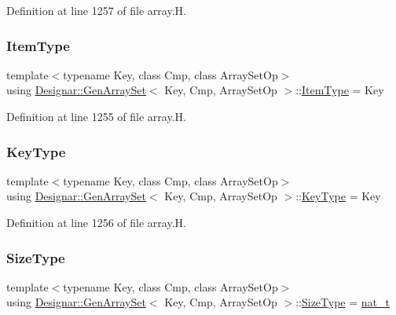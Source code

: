 Definition at line 1257 of file array.\+H.

\mbox{\label{class_designar_1_1_gen_array_set_a4db3cb71a2b2f88fee2a5f66688e5230}} 
\subsubsection{\texorpdfstring{Item\+Type}{ItemType}}
{\footnotesize\ttfamily template$<$typename Key, class Cmp, class Array\+Set\+Op$>$ \\
using \hyperlink{class_designar_1_1_gen_array_set}{Designar\+::\+Gen\+Array\+Set}$<$ Key, Cmp, Array\+Set\+Op $>$\+::\hyperlink{class_designar_1_1_gen_array_set_a4db3cb71a2b2f88fee2a5f66688e5230}{Item\+Type} =  Key}



Definition at line 1255 of file array.\+H.

\mbox{\label{class_designar_1_1_gen_array_set_a21195191743cf71430c939225a2c8d60}} 
\subsubsection{\texorpdfstring{Key\+Type}{KeyType}}
{\footnotesize\ttfamily template$<$typename Key, class Cmp, class Array\+Set\+Op$>$ \\
using \hyperlink{class_designar_1_1_gen_array_set}{Designar\+::\+Gen\+Array\+Set}$<$ Key, Cmp, Array\+Set\+Op $>$\+::\hyperlink{class_designar_1_1_gen_array_set_a21195191743cf71430c939225a2c8d60}{Key\+Type} =  Key}



Definition at line 1256 of file array.\+H.

\mbox{\label{class_designar_1_1_gen_array_set_aabe7047d492721160f291bf40ecf7745}} 
\subsubsection{\texorpdfstring{Size\+Type}{SizeType}}
{\footnotesize\ttfamily template$<$typename Key, class Cmp, class Array\+Set\+Op$>$ \\
using \hyperlink{class_designar_1_1_gen_array_set}{Designar\+::\+Gen\+Array\+Set}$<$ Key, Cmp, Array\+Set\+Op $>$\+::\hyperlink{class_designar_1_1_gen_array_set_aabe7047d492721160f291bf40ecf7745}{Size\+Type} =  \hyperlink{namespace_designar_aa72662848b9f4815e7bf31a7cf3e33d1}{nat\+\_\+t}}



